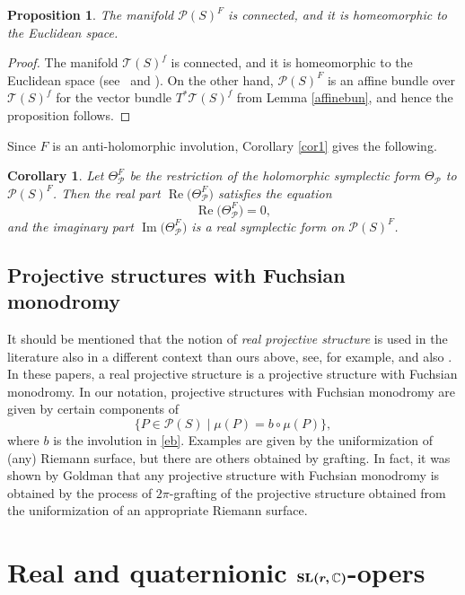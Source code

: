 \documentclass[10pt,a4paper]{amsart}
\numberwithin{equation}{section}
\newtheorem{Corollary}[Theorem]{Corollary}
\newtheorem{Proposition}[Theorem]{Proposition}
 { \theoremstyle{definition}
\newtheorem{Definition}[Theorem]{Definition}
\newtheorem{Note}[Theorem]{Note}
\newtheorem{Example}[Theorem]{Example}
\newtheorem{Remark}[Theorem]{Remark} }
\begin{document}
\begin{Proposition}\label{prop1}
The manifold ${\mathcal P}(S)^F$ is connected, and it is homeomorphic to the Euclidean space.
\end{Proposition}

\begin{proof}
The manifold ${\mathcal T}(S)^f$ is connected, and it is homeomorphic to the Euclidean space
(see~\cite[p.~122]{Ea} and \cite{Kr}). On the other hand, ${\mathcal P}(S)^F$ is an affine bundle over
${\mathcal T}(S)^f$ for the vector bundle $T^*{\mathcal T}(S)^f$ from Lemma \ref{affinebun}, and hence
the proposition follows.
\end{proof}

Since $F$ is an anti-holomorphic involution, Corollary \ref{cor1} gives the following.

\begin{Corollary}\label{cor2}
Let $\Theta^F_{\mathcal P}$ be the restriction of the holomorphic symplectic form $\Theta_{\mathcal P}$ to
${\mathcal P}(S)^F$. Then the real part $\operatorname{Re}\bigl(\Theta^F_{\mathcal P}\bigr)$ satisfies the equation
\[
\operatorname{Re}\bigl(\Theta^F_{\mathcal P}\bigr) = 0,
\]
and the imaginary part $\operatorname{Im}\bigl(\Theta^F_{\mathcal P}\bigr)$ is a real symplectic form on ${\mathcal P}(S)^F$.
\end{Corollary}

\subsection{Projective structures with Fuchsian monodromy}

It should be mentioned that the notion of {\em real projective structure} is used in the literature also in a
different context than ours above, see, for example, \cite{Fa} and also \cite{Hel, Tak,Te}. In these papers, a real projective structure
is a projective structure with Fuchsian monodromy.
In our notation, projective structures with Fuchsian monodromy are given by certain components of
\[\{P\in\mathcal P(S) \mid \mu(P) = b\circ\mu(P)\},\]
where $b$ is the involution in \eqref{eb}.
Examples are given by the uniformization of (any) Riemann surface, but there are others obtained by grafting. In fact, it was shown by Goldman \cite{Go2} that any projective structure with Fuchsian monodromy is obtained by the process of $2\pi$-grafting of the projective structure obtained from
the uniformization of an appropriate Riemann surface.

\section[Real and quaternionic SL(r,C)-opers]{Real and quaternionic $\boldsymbol{{\rm SL}(r,\mathbb{C})}$-opers}\label{realoper}
\end{document}
